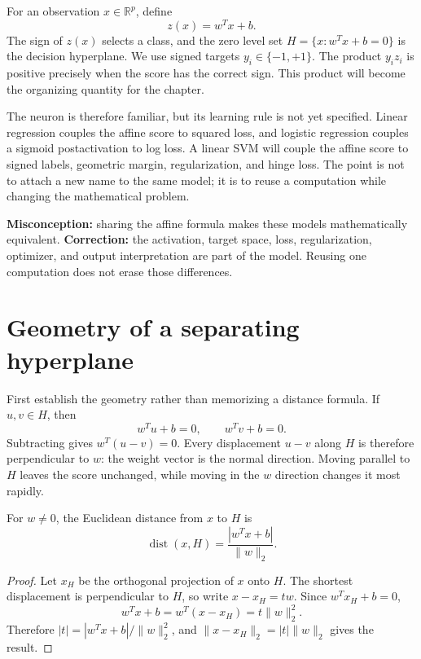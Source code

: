 For an observation $x\in\mathbb R^p$, define
\[
  z(x)=w^Tx+b.
\]
The sign of $z(x)$ selects a class, and the zero level set
$H=\{x:w^Tx+b=0\}$ is the decision hyperplane. We use signed targets
$y_i\in\{-1,+1\}$. The product $y_i z_i$ is positive precisely when the
score has the correct sign. This product will become the organizing quantity
for the chapter.

The neuron is therefore familiar, but its learning rule is not yet specified.
Linear regression couples the affine score to squared loss, and logistic
regression couples a sigmoid postactivation to log loss. A linear SVM will
couple the affine score to signed labels, geometric margin, regularization, and
hinge loss. The point is not to attach a new name to the same model; it is to
reuse a computation while changing the mathematical problem.

\begin{misconceptionbox}
\textbf{Misconception:} sharing the affine formula makes these models
mathematically equivalent. \textbf{Correction:} the activation, target space,
loss, regularization, optimizer, and output interpretation are part of the
model. Reusing one computation does not erase those differences.
\end{misconceptionbox}

\section{Geometry of a separating hyperplane}

First establish the geometry rather than memorizing a distance formula. If
$u,v\in H$, then
\[
  w^Tu+b=0,\qquad w^Tv+b=0.
\]
Subtracting gives $w^T(u-v)=0$. Every displacement $u-v$ along $H$ is
therefore perpendicular to $w$: the weight vector is the normal direction.
Moving parallel to $H$ leaves the score unchanged, while moving in the $w$
direction changes it most rapidly.

\begin{proposition}
For $w\ne 0$, the Euclidean distance from $x$ to $H$ is
\[
  \operatorname{dist}(x,H)=\frac{|w^Tx+b|}{\lVert w\rVert_2}.
\]
\end{proposition}

\begin{proof}
Let $x_H$ be the orthogonal projection of $x$ onto $H$. The shortest
displacement is perpendicular to $H$, so write $x-x_H=tw$. Since
$w^Tx_H+b=0$,
\[
  w^Tx+b=w^T(x-x_H)=t\lVert w\rVert_2^2.
\]
Therefore $|t|=|w^Tx+b|/\lVert w\rVert_2^2$, and
$\lVert x-x_H\rVert_2=|t|\lVert w\rVert_2$ gives the result.
\end{proof}

